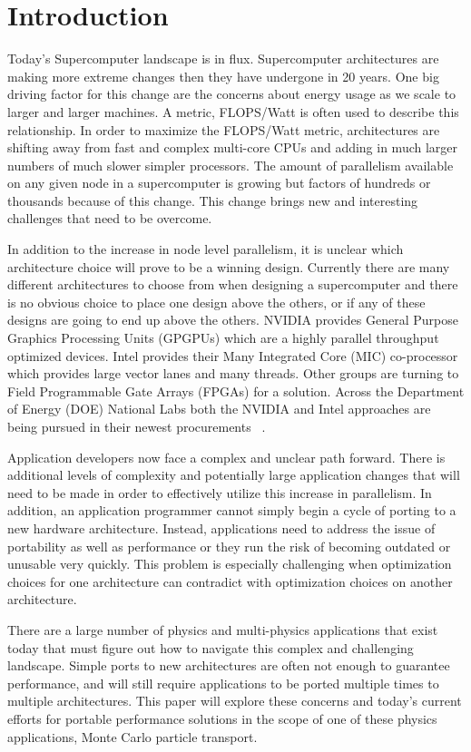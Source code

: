 \section{ \textbf{Introduction}}

Today's Supercomputer landscape is in flux.
%
Supercomputer architectures are making more extreme changes then they have undergone in 20 years.
%
One big driving factor for this change are the concerns about energy usage as we scale to larger and larger machines.
%
A metric, FLOPS/Watt is often used to describe this relationship.
%
In order to maximize the FLOPS/Watt metric, architectures are shifting away from fast and complex multi-core CPUs and adding in much larger numbers of much slower simpler processors.
%
The amount of parallelism available on any given node in a supercomputer is growing but factors of hundreds or thousands because of this change.
%
This change brings new and interesting challenges that need to be overcome.
%

%
In addition to the increase in node level parallelism, it is unclear which architecture choice will prove to be a winning design.
%
Currently there are many different architectures to choose from when designing a supercomputer and there is no obvious choice to place one design above the others, or if any of these designs are going to end up above the others.
%
NVIDIA provides General Purpose Graphics Processing Units (GPGPUs) which are a highly parallel throughput optimized devices.
%
Intel provides their Many Integrated Core (MIC) co-processor which provides large vector lanes and many threads.
%
Other groups are turning to Field Programmable Gate Arrays (FPGAs) for a solution.
%
Across the Department of Energy (DOE) National Labs both the NVIDIA and Intel approaches are being pursued in their newest procurements ~\cite{coralWeb, trinityWeb}.
%

Application developers now face a complex and unclear path forward.
%
There is additional levels of complexity and potentially large application changes that will need to be made in order to effectively utilize this increase in parallelism.
%
In addition, an application programmer cannot simply begin a cycle of porting to a new hardware architecture.
%
Instead, applications need to address the issue of portability as well as performance or they run the risk of becoming outdated or unusable very quickly.
%
This problem is especially challenging when optimization choices for one architecture can contradict with optimization choices on another architecture.
%

%
There are a large number of physics and multi-physics applications that exist today that must figure out how to navigate this complex and challenging landscape.
%
Simple ports to new architectures are often not enough to guarantee performance, and will still require applications to be ported multiple times to multiple architectures.
%
This paper will explore these concerns and today's current efforts for portable performance solutions in the scope of one of these physics applications, Monte Carlo particle transport.
%

